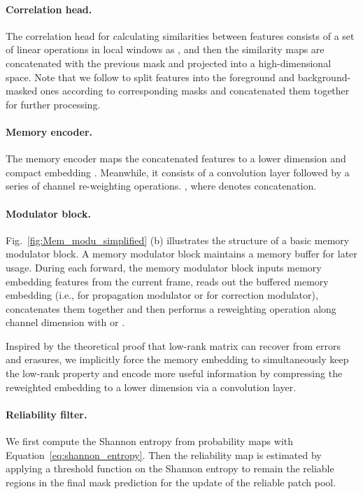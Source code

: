 \documentclass[letterpaper]{article} \usepackage{aaai22}  \usepackage{times}  \usepackage{helvet}  \usepackage{courier}  \usepackage[hyphens]{url}  \usepackage{graphicx} \urlstyle{rm} \def\UrlFont{\rm}  \usepackage{natbib}  \usepackage{caption} \DeclareCaptionStyle{ruled}{labelfont=normalfont,labelsep=colon,strut=off} \frenchspacing  \setlength{\pdfpagewidth}{8.5in}  \setlength{\pdfpageheight}{11in}  \usepackage{algorithm}
\newcommand{\fig}[1]{Fig.~#1}
\newcommand{\eqn}[1]{Equation~#1}
\begin{document}
\paragraph{Correlation head.}
The correlation head for calculating similarities between features consists of a set of linear operations in local windows as \cite{voigtlaender2019feelvos}, and then the similarity maps are concatenated with the previous mask and projected into a high-dimensional space. Note that we follow \cite{yang2020collaborative} to split features into the foreground and background-masked ones according to corresponding masks and concatenated them together for further processing.

\paragraph{Memory encoder.}
The memory encoder  maps the concatenated features  to a lower dimension and compact embedding . Meanwhile, it consists of a  convolution layer followed by a series of channel re-weighting operations. , where  denotes concatenation.

\paragraph{Modulator block.}

\fig{\ref{fig:Mem_modu_simplified}} (b) illustrates the structure of a basic memory modulator block.
A memory modulator block maintains a memory buffer  for later usage. During each forward, the memory modulator block inputs memory embedding features  from the current frame, reads out the buffered memory embedding (i.e.,  for propagation modulator or  for correction modulator), concatenates them together and then performs a reweighting operation along channel dimension with  or . 

Inspired by the theoretical proof \cite{chen2011lowrank} that low-rank matrix can recover from errors and erasures, we implicitly force the memory embedding to simultaneously keep the low-rank property and encode more useful information by compressing the reweighted embedding to a lower dimension via a  convolution layer. 


\paragraph{Reliability filter.}
We first compute the Shannon entropy  from  probability maps  with \eqn{\ref{eq:shannon_entropy}}. Then the reliability map  is estimated by applying a threshold function  on the Shannon entropy  to remain the reliable regions in the final mask prediction for the update of the reliable patch pool. 
\end{document}
